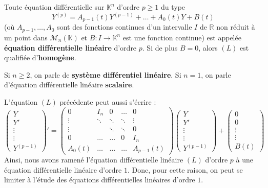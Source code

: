 
	\begin{definition}
		Toute équation différentielle sur $\mathbb{K}^n$ d'ordre $p \geq 1$ du type
		\[ Y^{(p)} = A_{p-1}(t) Y^{(p-1)} + \dots + A_0(t) Y + B(t) \tag{$L$} \]
		(où $A_{p-1}, \dots, A_0$ sont des fonctions continues d'un intervalle $I$ de $\mathbb{R}$ non réduit à un point dans $\mathcal{M}_n(\mathbb{K})$ et $B : I \rightarrow \mathbb{K}^n$ est une fonction continue) est appelée \textbf{équation différentielle linéaire} d'ordre $p$.
		\newpar
		Si de plus $B = 0$, alors $(L)$ est qualifiée d'\textbf{homogène}.
	\end{definition}

	\begin{definition}
		Si $n \geq 2$, on parle de \textbf{système différentiel linéaire}. Si $n = 1$, on parle d'équation différentielle linéaire \textbf{scalaire}.
	\end{definition}

	\begin{remark}
		L'équation $(L)$ précédente peut aussi s'écrire :
		\[ \begin{pmatrix} Y \\ Y' \\ \vdots \\ \vdots \\ Y^{(p-1)} \end{pmatrix}' = \begin{pmatrix} 0 & I_n & 0 & \dots & 0 \\ \vdots & \ddots & \ddots & \ddots & \vdots \\ \vdots &  & \ddots & \ddots & 0 \\ 0 & \dots & \dots & 0 & I_n \\ A_0(t) & \dots & \dots & \dots & A_{p-1}(t) \end{pmatrix} \begin{pmatrix} Y \\ Y' \\ \vdots \\ \vdots \\ Y^{(p-1)} \end{pmatrix} + \begin{pmatrix} 0 \\ 0 \\ \vdots \\ \vdots \\ B(t) \end{pmatrix} \]
		Ainsi, nous avons ramené l'équation différentielle linéaire $(L)$ d'ordre $p$ à une équation différentielle linéaire d'ordre $1$. Donc, pour cette raison, on peut se limiter à l'étude des équations différentielles linéaires d'ordre $1$.
	\end{remark}

